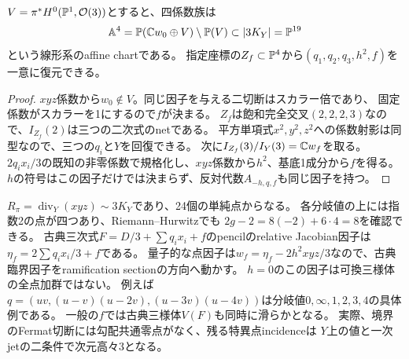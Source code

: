 \begin{corollary}[四係数の線形系と埋込み付き同時復元]
$V=\pi^*H^0(\mathbb P^1,\mathcal O(3))$とすると、四係数族は
\[
 \mathbb A^4=\mathbb P(\mathbb C w_0\oplus V)\setminus\mathbb P(V)\subset|3K_Y|=\mathbb P^{19}
\]
という線形系のaffine chartである。
指定座標の$Z_f\subset\mathbb P^4$から$(q_1,q_2,q_3,h^2,f)$を一意に復元できる。
\end{corollary}
\begin{proof}
$xyz$係数から$w_0\notin V$。同じ因子を与える二切断はスカラー倍であり、
固定係数がスカラーを1にするので$f$が決まる。
$Z_f$は飽和完全交叉$(2,2,2,3)$なので、$I_{Z_f}(2)$は三つの二次式のnetである。
平方単項式$x^2,y^2,z^2$への係数射影は同型なので、三つの$q_i$と$Y$を回復できる。
次に$I_{Z_f}(3)/I_Y(3)=\mathbb C w_f$を取る。
$2q_ix_i/3$の既知の非零係数で規格化し、$xyz$係数から$h^2$、基底1成分から$f$を得る。
$h$の符号はこの因子だけでは決まらず、反対代数$A_{-h,q,f}$も同じ因子を持つ。
\end{proof}
\begin{remark}[ramification方向への量子補正]
$R_\pi=\operatorname{div}_Y(xyz)\sim3K_Y$であり、24個の単純点からなる。
各分岐値の上には指数2の点が四つあり、Riemann--Hurwitzでも
$2g-2=8(-2)+6\cdot4=8$を確認できる。
古典三次式$F=D/3+\sum q_ix_i+f$のpencilのrelative Jacobian因子は
$\eta_f=2\sum q_ix_i/3+f$である。
量子的な点因子は$w_f=\eta_f-2h^2xyz/3$なので、古典臨界因子をramification sectionの方向へ動かす。
$h=0$のこの因子は可換三様体の全点加群ではない。
例えば$q=(uv,(u-v)(u-2v),(u-3v)(u-4v))$は分岐値$0,\infty,1,2,3,4$の具体例である。
一般の$f$では古典三様体$V(F)$も同時に滑らかとなる。
実際、境界のFermat切断には勾配共通零点がなく、残る特異点incidenceは
$Y$上の値と一次jetの二条件で次元高々3となる。
\end{remark}

